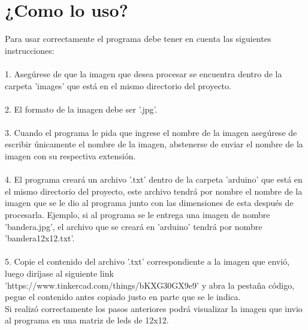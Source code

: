 \documentclass{article}
\begin{document}
\section{¿Como lo uso?}
Para usar correctamente el programa debe tener en cuenta las siguientes instrucciones: \\ \\
1. Asegúrese de que la imagen que desea procesar se encuentra dentro de la carpeta 'images' que está en el mismo directorio del proyecto. \\ \\
2. El formato de la imagen debe ser '.jpg'. \\ \\
3. Cuando el programa le pida que ingrese el nombre de la imagen asegúrese de escribir únicamente el nombre de la imagen, abstenerse de enviar el nombre de la imagen con su respectiva extensión. \\ \\
4. El programa creará un archivo '.txt' dentro de la carpeta 'arduino’ que está en el mismo directorio del proyecto, este archivo tendrá por nombre el nombre de la imagen que se le dio al programa junto con las dimensiones de esta después de procesarla. Ejemplo, si al programa se le entrega una imagen de nombre 'bandera.jpg', el archivo que se creará en 'arduino' tendrá por nombre 'bandera12x12.txt'.\\ \\
5. Copie el contenido del archivo '.txt' correspondiente a la imagen que envió, luego diríjase al siguiente link 'https://www.tinkercad.com/things/bKXG30GX9e9' y abra la pestaña código, pegue el contenido antes copiado justo en parte que se le indica. \\

Si realizó correctamente los pasos anteriores podrá visualizar la imagen que invio al programa en una matriz de leds de 12x12.
\end{document}
